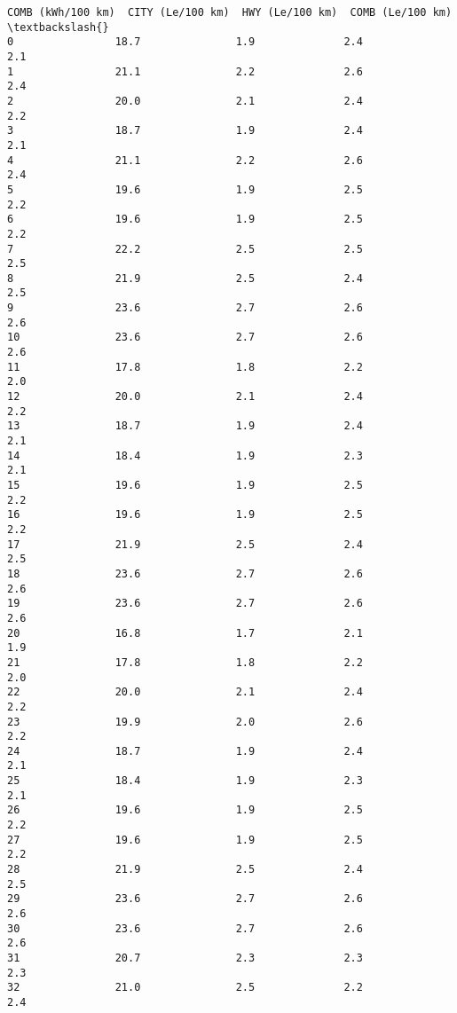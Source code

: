 \documentclass[11pt]{article}
\begin{document}
\begin{Verbatim}[commandchars=\\\{\}]
    COMB (kWh/100 km)  CITY (Le/100 km)  HWY (Le/100 km)  COMB (Le/100 km)  \textbackslash{}
0                18.7               1.9              2.4               2.1   
1                21.1               2.2              2.6               2.4   
2                20.0               2.1              2.4               2.2   
3                18.7               1.9              2.4               2.1   
4                21.1               2.2              2.6               2.4   
5                19.6               1.9              2.5               2.2   
6                19.6               1.9              2.5               2.2   
7                22.2               2.5              2.5               2.5   
8                21.9               2.5              2.4               2.5   
9                23.6               2.7              2.6               2.6   
10               23.6               2.7              2.6               2.6   
11               17.8               1.8              2.2               2.0   
12               20.0               2.1              2.4               2.2   
13               18.7               1.9              2.4               2.1   
14               18.4               1.9              2.3               2.1   
15               19.6               1.9              2.5               2.2   
16               19.6               1.9              2.5               2.2   
17               21.9               2.5              2.4               2.5   
18               23.6               2.7              2.6               2.6   
19               23.6               2.7              2.6               2.6   
20               16.8               1.7              2.1               1.9   
21               17.8               1.8              2.2               2.0   
22               20.0               2.1              2.4               2.2   
23               19.9               2.0              2.6               2.2   
24               18.7               1.9              2.4               2.1   
25               18.4               1.9              2.3               2.1   
26               19.6               1.9              2.5               2.2   
27               19.6               1.9              2.5               2.2   
28               21.9               2.5              2.4               2.5   
29               23.6               2.7              2.6               2.6   
30               23.6               2.7              2.6               2.6   
31               20.7               2.3              2.3               2.3   
32               21.0               2.5              2.2               2.4   

\end{Verbatim}
\end{document}

